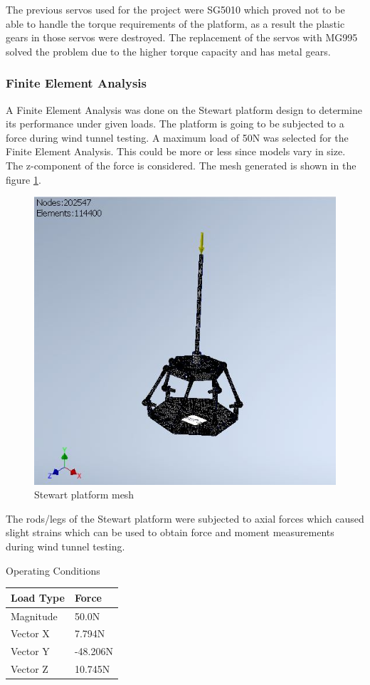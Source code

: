 The previous servos used for the project were SG5010 which proved not to be able to handle the torque requirements of the platform,
as a result the plastic gears in those servos were destroyed. The replacement of the servos with MG995 solved the problem due to the higher torque capacity and has metal gears.

\subsubsection{Finite Element Analysis}
A Finite Element Analysis was done on the Stewart platform design to determine its performance under given loads. The platform is going to be subjected to a force during wind tunnel testing. A maximum load of 50N was selected for the Finite Element Analysis. This could be more or less since models vary in size. The z-component of the force is considered.
The mesh generated is shown in the figure \ref{fig:feamesh}.
\begin{center}
	\begin{figure}[H]
		\centering
		\includegraphics[width=0.75\linewidth]{Figures/FEA}
		\caption[Stewart platform mesh]{Stewart platform mesh}
		\label{fig:feamesh}
	\end{figure}
\end{center}
The rods/legs of the Stewart platform were subjected to axial forces which caused slight strains which can be used to obtain force and moment measurements during wind tunnel testing.
\clearpage
\begin{center}
	\begin{table}[H]
		\caption{Operating Conditions}
		\centering
	\end{table}
	\begin{tabular}{|l|l|}
		\hline
		\textbf{Load Type} & \textbf{Force} \\
		\hline
		Magnitude          & 50.0N          \\
		\hline
		Vector X           & 7.794N         \\
		\hline
		Vector Y           & -48.206N       \\
		\hline
		Vector Z           & 10.745N        \\
		\hline
	\end{tabular}
\end{center}

